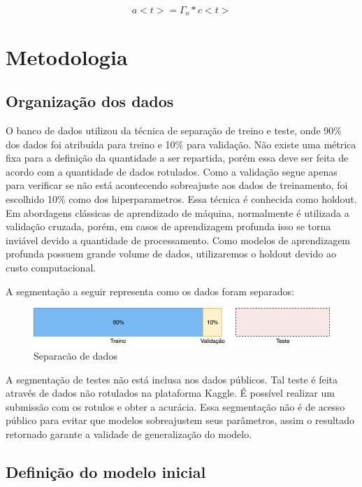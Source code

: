 \documentclass[12pt]{article}
\begin{document}
\begin{equation}
    a<t>=\Gamma_o*c<t>
\end{equation}

\section{Metodologia}

\subsection{Organização dos dados}

O banco de dados utilizou da técnica de separação de treino e teste, onde 90\% dos dados foi atribuída para treino e 10\% para validação. Não existe uma métrica fixa para a definição da quantidade a ser repartida, porém essa deve ser feita de acordo com a quantidade de dados rotulados. Como a validação segue apenas para verificar se não está acontecendo sobreajuste aos dados de treinamento, foi escolhido 10\% como dos hiperparametros. Essa técnica é conhecida como holdout. Em abordagens clássicas de aprendizado de máquina, normalmente é utilizada a validação cruzada, porém, em casos de aprendizagem profunda isso se torna inviável devido a quantidade de processamento. Como modelos de aprendizagem profunda possuem grande volume de dados, utilizaremos o holdout devido ao custo computacional.

A segmentação a seguir representa como os dados foram separados:

\begin{figure}[ht]
\centering
\includegraphics[width=1\textwidth]{images/datasplit.png}
\caption{Separacão de dados}
\label{fig:datasplit}
\end{figure}

A segmentação de testes não está inclusa nos dados públicos. Tal teste é feita através de dados não rotulados na plataforma Kaggle. É possível realizar um submissão com os rotulos e obter a acurácia. Essa segmentação não é de acesso público para evitar que modelos sobreajustem seus parâmetros, assim o resultado retornado garante a validade de generalização do modelo.

\subsection{Definição do modelo inicial}
\end{document}
